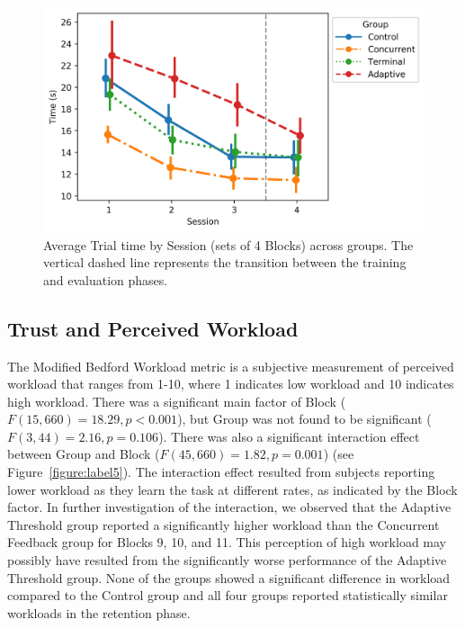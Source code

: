 \begin{figure}[hbt!]
	\centering
	\includegraphics[height=.4\textwidth]{figures/EMG/TrialTime_session}
	\caption[Average Trial time by Session across groups]{Average Trial time by Session (sets of 4 Blocks) across groups.
		The vertical dashed line represents the transition between the training and evaluation phases.}
	\label{figure:label4}
\end{figure}

\subsection{Trust and Perceived Workload}
The Modified Bedford Workload metric is a subjective measurement of perceived workload that ranges from 1-10, where 1 indicates low workload and 10 indicates high workload.
There was a significant main factor of Block ($F(15, 660) = 18.29, p < 0.001$), but Group was not found to be significant ($F(3, 44) = 2.16, p = 0.106$).
There was also a significant interaction effect between Group and Block ($F(45, 660)= 1.82, p = 0.001$) (see Figure~\ref{figure:label5}).
The interaction effect resulted from subjects reporting lower workload as they learn the task at different rates, as indicated by the Block factor.
In further investigation of the interaction, we observed that the Adaptive Threshold group reported a significantly higher workload than the Concurrent Feedback group for Blocks 9, 10, and 11.
This perception of high workload may possibly have resulted from the significantly worse performance of the Adaptive Threshold group.
None of the groups showed a significant difference in workload compared to the Control group and all four groups reported statistically similar workloads in the retention phase.

